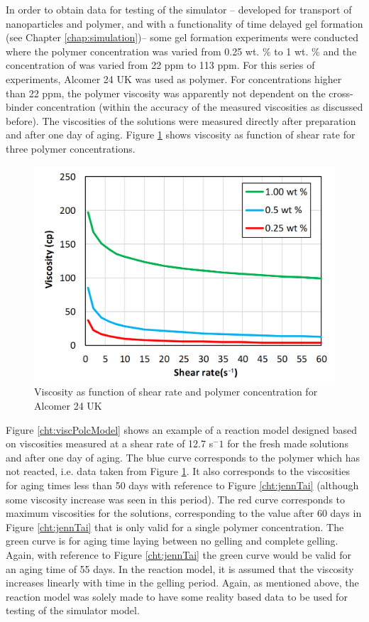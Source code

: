 In order to obtain data for testing of the simulator \--- developed for transport of nanoparticles and polymer, and with a functionality of time delayed gel formation (see Chapter \ref{chap:simulation})\--- some gel formation experiments were conducted where the polymer concentration was varied from 0.25 wt. \% to 1 wt. \% and the concentration of  was varied from 22 ppm to 113 ppm. For this series of experiments, Alcomer 24 UK was used as polymer. For concentrations higher than 22 ppm, the polymer viscosity was apparently not dependent on the cross-binder concentration (within the accuracy of the measured viscosities as discussed before). The viscosities of the solutions were measured directly after preparation and after one day of aging. Figure \ref{cht:viscAlco} shows viscosity as function of shear rate for three polymer concentrations. 
\begin{figure}
    \centering
    \includegraphics[width=.75\textwidth]{img/cht/viscAlcomer.png}
    \caption{Viscosity as function of shear rate and polymer concentration for Alcomer 24 UK}
    \label{cht:viscAlco}
\end{figure}

Figure \ref{cht:viscPolcModel} shows an example of a reaction model designed based on viscosities measured at a shear rate of 12.7 s$^-1$ for the fresh made solutions and after one day of aging. The blue curve corresponds to the polymer which has not reacted, i.e. data taken from Figure \ref{cht:viscAlco}. It also corresponds to the viscosities for aging times less than 50 days with reference to Figure \ref{cht:jennTai} (although some viscosity increase was seen in this period). The red curve corresponds to maximum viscosities for the solutions, corresponding to the value after 60 days in Figure \ref{cht:jennTai} that is only valid for a single polymer concentration. The green curve is for aging time laying between no gelling and complete gelling. Again, with reference to Figure \ref{cht:jennTai} the green curve would be valid for an aging time of 55 days. In the reaction model, it is assumed that the viscosity increases linearly with time in the gelling period. Again, as mentioned above, the reaction model was solely made to have some reality based data to be used for testing of the simulator model. 


